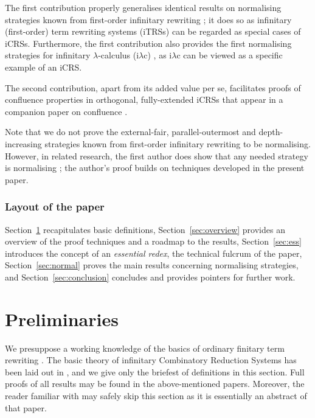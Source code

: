 \documentclass{LMCS}
\theoremstyle{definition}
\newcommand{\iLC}{i$\lambda$c\xspace}
\begin{document}
The first contribution properly generalises identical results on normalising strategies known from first-order infinitary rewriting \cite{KKSV95}; it does so as infinitary (first-order) term rewriting systems (iTRSs) can be regarded as special cases of iCRSs. Furthermore, the first contribution also provides the first normalising strategies for infinitary $\lambda$-calculus (\iLC) \cite{KKSV97}, as \iLC can be viewed as a specific example of an iCRS.

The second contribution, apart from its added value per se, facilitates proofs of confluence properties in orthogonal, fully-extended iCRSs that appear in a companion paper on confluence \cite{paper_iv}.

Note that we do not prove the external-fair, parallel-outermost and depth-increasing strategies known from first-order infinitary rewriting \cite{KKSV95} to be normalising. However, in related research, the first author does show that any needed strategy is normalising \cite{K08}; the author's proof builds on techniques developed in the present paper.

\subsubsection*{Layout of the paper}

Section~\ref{sec:preliminaries} recapitulates basic definitions, Section~\ref{sec:overview} provides an overview of the proof techniques and a roadmap to the results, Section~\ref{sec:ess} introduces the concept of an \emph{essential redex}, the technical fulcrum of the paper, Section~\ref{sec:normal} proves the main results concerning normalising strategies, and Section~\ref{sec:conclusion} concludes and provides pointers for further work.

\section{Preliminaries}
\label{sec:preliminaries}

We presuppose a working knowledge of the basics of ordinary finitary term rewriting \cite{T03}. The basic theory of infinitary Combinatory Reduction Systems
has been laid out in \cite{JJ05a,JJ05b}, and we give only the briefest of definitions in this section. Full proofs of all results may be
found in the above-mentioned papers. Moreover, the reader familiar with \cite{paper_i} may safely skip this section as it is essentially an abstract of that paper.
\end{document}
